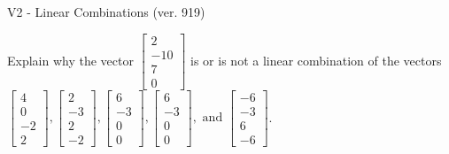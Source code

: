\begin{exercise}
  \begin{exerciseTitle}V2 - Linear Combinations (ver. 919)\end{exerciseTitle}
  \begin{exerciseStatement}
    Explain why the vector \(\left[\begin{array}{c}
2 \\
-10 \\
7 \\
0
\end{array}\right]\)  is or is not a linear 
	combination of the vectors \(\left[\begin{array}{c}
4 \\
0 \\
-2 \\
2
\end{array}\right] , \left[\begin{array}{c}
2 \\
-3 \\
2 \\
-2
\end{array}\right] , \left[\begin{array}{c}
6 \\
-3 \\
0 \\
0
\end{array}\right] , \left[\begin{array}{c}
6 \\
-3 \\
0 \\
0
\end{array}\right] , \text{ and } \left[\begin{array}{c}
-6 \\
-3 \\
6 \\
-6
\end{array}\right]\).
	



\end{exerciseStatement}
\end{exercise}
